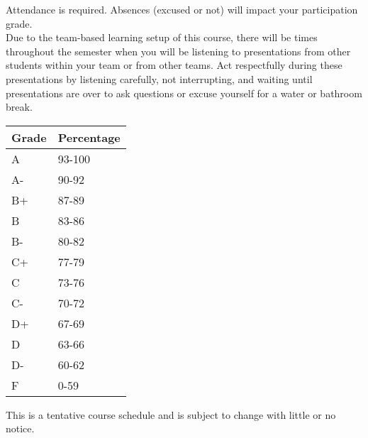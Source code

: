 \documentclass[10pt]{article}
\begin{document}

 Attendance is required. Absences (excused or not) will impact your participation grade.\\

 Due to the team-based learning setup of this course, there will be times throughout the semester when you will be listening to presentations from other students within your team or from other teams. Act respectfully during these presentations by listening carefully, not interrupting, and waiting until presentations are over to ask questions or excuse yourself for a water or bathroom break.

%  
%  
\clearpage

\begin{table}[htp]
\begin{tabular}{ll}
Grade & Percentage \\
\hline
A & 93-100 \\
A- & 90-92 \\
B+ & 87-89 \\
B & 83-86 \\
B- & 80-82 \\
C+ & 77-79 \\
C & 73-76 \\
C- & 70-72 \\
D+ & 67-69 \\
D & 63-66 \\
D- & 60-62\\
F & 0-59 \\
\end{tabular}
\end{table}%

\bigskip
{}

\noindent This is a tentative course schedule and is subject to change with little or no notice.
\end{document}

